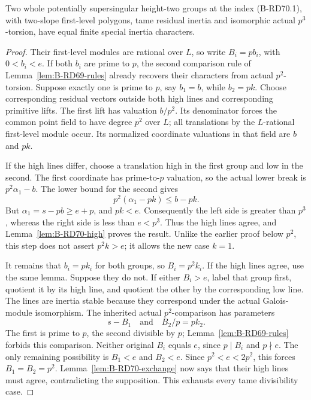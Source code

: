 \begin{proposition}
\label{prop:B-RD70-tame}
Two whole potentially supersingular height-two groups at the
index (B-RD70.1), with two-slope first-level polygons, tame
residual inertia and isomorphic actual \(p^3\)-torsion, have
equal finite special inertia characters.
\end{proposition}
\begin{proof}
Their first-level modules are rational over \(L\), so write
\(B_i=pb_i\), with \(0<b_i<e\).
If both \(b_i\) are prime to \(p\), the second comparison
rule of Lemma~\ref{lem:B-RD69-rules} already recovers their
characters from actual \(p^2\)-torsion.
Suppose exactly one is prime to \(p\), say \(b_1=b\), while
\(b_2=pk\). Choose corresponding residual vectors outside
both high lines and corresponding primitive lifts.
The first lift has valuation \(b/p^2\). Its denominator
forces the common point field to have degree \(p^2\)
over \(L\); all translations by the \(L\)-rational first-level
module occur. Its normalized coordinate valuations in that
field are \(b\) and \(pk\).

If the high lines differ, choose a translation high in the
first group and low in the second. The first coordinate has
prime-to-\(p\) valuation, so the actual lower break is
\(p^2\alpha_1-b\). The lower bound for the second gives
\[
 p^2(\alpha_1-pk)\le b-pk .
 \tag{B-RD70.8}
\]
But \(\alpha_1=s-pb\ge e+p\), and \(pk<e\).
Consequently the left side is greater than \(p^3\),
whereas the right side is less than \(e<p^3\).
Thus the high lines agree, and
Lemma~\ref{lem:B-RD70-high} proves the result.
Unlike the earlier proof below \(p^2\), this step does not
assert \(p^2k>e\); it allows the new case \(k=1\).

It remains that \(b_i=pk_i\) for both groups, so
\(B_i=p^2k_i\). If the high lines agree, use the same lemma.
Suppose they do not. If either \(B_i>e\), label that group
first, quotient it by its high line, and quotient the other
by the corresponding low line. The lines are inertia stable
because they correspond under the actual Galois-module
isomorphism. The inherited actual \(p^2\)-comparison has
parameters
\[
                  s-B_1\quad\text{and}\quad B_2/p=pk_2.
 \tag{B-RD70.9}
\]
The first is prime to \(p\), the second divisible by \(p\);
Lemma~\ref{lem:B-RD69-rules} forbids this comparison.
Neither original \(B_i\) equals \(e\), since \(p\mid B_i\)
and \(p\nmid e\). The only remaining possibility is
\(B_1<e\) and \(B_2<e\). Since \(p^2<e<2p^2\), this
forces \(B_1=B_2=p^2\).
Lemma~\ref{lem:B-RD70-exchange} now says that their high
lines must agree, contradicting the supposition.
This exhausts every tame divisibility case.
\end{proof}

